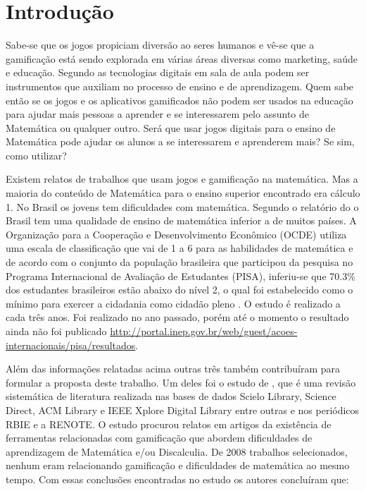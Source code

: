 \chapter[Introdução]{Introdução}


Sabe-se que os jogos propiciam diversão ao seres humanos e vê-se que a gamificação está sendo explorada em várias áreas diversas como marketing, saúde e educação. Segundo \cite{revbibmatgam} as tecnologias digitais em sala de aula podem ser instrumentos que auxiliam no processo de ensino e de aprendizagem. Quem sabe então se os jogos e os aplicativos gamificados não podem ser usados na educação para ajudar mais pessoas a aprender e se interessarem pelo assunto de Matemática ou qualquer outro. Será que usar jogos digitais para o ensino de Matemática pode ajudar os alunos a se interessarem e aprenderem mais? Se sim, como utilizar? 

Existem relatos de trabalhos que usam jogos e gamificação na matemática. Mas a maioria do conteúdo de Matemática para o ensino superior encontrado era cálculo 1.  No Brasil os jovens tem dificuldades com matemática. Segundo o relatório do \cite{inep2015nivelcidadania} o Brasil tem uma qualidade de ensino de matemática inferior a de muitos países. A Organização para a Cooperação e Desenvolvimento Econômico (OCDE) utiliza uma escala de classificação que vai de 1 a 6 para as habilidades de matemática e de acordo com o conjunto da população brasileira que participou da pesquisa no Programa Internacional de Avaliação de Estudantes (PISA), inferiu-se que 70.3\% dos estudantes brasileiros estão abaixo do nível 2, o qual foi estabelecido como o mínimo para exercer a cidadania como cidadão pleno \cite{inep2015nivelcidadania}.
O estudo é realizado a cada três anos. Foi realizado no ano passado, porém até o momento o resultado ainda não foi publicado \url{http://portal.inep.gov.br/web/guest/acoes-internacionais/pisa/resultados}.

Além das informações relatadas acima outras três também contribuíram para formular a proposta deste trabalho. Um deles foi o estudo de \cite{revbibmatgam}, que é uma revisão sistemática de literatura realizada nas bases de dados Scielo Library, Science Direct, ACM Library e IEEE Xplore Digital Library entre outras e nos periódicos RBIE e a RENOTE. O estudo procurou relatos em artigos da existência de ferramentas relacionadas com gamificação que abordem dificuldades de aprendizagem de Matemática e/ou Discalculia. De 2008 trabalhos selecionados, nenhum eram relacionando gamificação e dificuldades de matemática ao mesmo tempo. Com essas conclusões encontradas no estudo os autores \cite{revbibmatgam} concluíram que:

